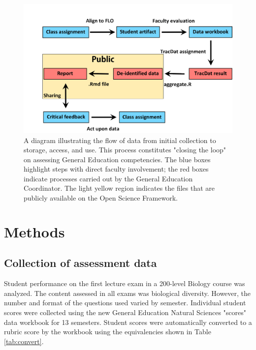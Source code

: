 \documentclass[fleqn,10pt]{SelfArx}\usepackage[]{graphicx}\usepackage[]{color}
\begin{document}
\begin{figure}[htb]\centering %
\includegraphics[width=\textwidth]{./art/process}
\protect\caption{A diagram illustrating the flow of data from initial collection to storage, access, and use. This process constitutes "closing the loop" on assessing General Education competencies. The blue boxes highlight steps with direct faculty involvement; the red boxes indicate processes carried out by the General Education Coordinator. The light yellow region indicates the files that are publicly available on the Open Science Framework.}
\label{fig:process.pdf}
\end{figure}


\section{Methods}

\subsection{Collection of assessment data}
Student performance on the first lecture exam in a 200-level Biology course was analyzed. The content assessed in all exams was biological diversity. However, the number and format of the questions used varied by semester. Individual student scores were collected using the new General Education Natural Sciences "scores" data workbook for 13 semesters. Student scores were automatically converted to a rubric score by the workbook using the equivalencies shown in Table \ref{tab:convert}.
\end{document}
